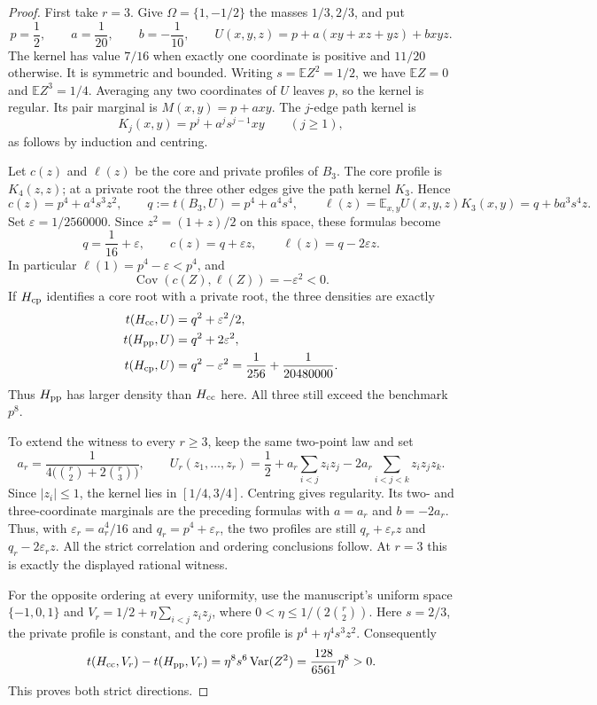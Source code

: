 \begin{proof}
First take $r=3$.  Give $\Omega=\{1,-1/2\}$ the masses $1/3,2/3$, and put
\[
 p=\frac12,\qquad a=\frac1{20},\qquad b=-\frac1{10},\qquad
 U(x,y,z)=p+a(xy+xz+yz)+bxyz.
\]
The kernel has value $7/16$ when exactly one coordinate is positive
and $11/20$ otherwise.  It is symmetric and bounded.
Writing $s=\mathbb EZ^2=1/2$, we have $\mathbb EZ=0$ and
$\mathbb EZ^3=1/4$.  Averaging any two coordinates of $U$ leaves
$p$, so the kernel is regular.  Its pair marginal is $M(x,y)=p+axy$.
The $j$-edge path kernel is
\[
 K_j(x,y)=p^j+a^js^{j-1}xy\qquad(j\ge1),
\]
as follows by induction and centring.

Let $c(z)$ and $\ell(z)$ be the core and private profiles of $B_3$.
The core profile is $K_4(z,z)$; at a private root the three other
edges give the path kernel $K_3$.  Hence
\[
 c(z)=p^4+a^4s^3z^2,\qquad
 q:=t(B_3,U)=p^4+a^4s^4,\qquad
 \ell(z)=\mathbb E_{x,y}U(x,y,z)K_3(x,y)
        =q+ba^3s^4z.
\]
Set $\varepsilon=1/2560000$.  Since $z^2=(1+z)/2$ on this space,
these formulas become
\[
 q=\frac1{16}+\varepsilon,\qquad
 c(z)=q+\varepsilon z,\qquad
 \ell(z)=q-2\varepsilon z.
\]
In particular $\ell(1)=p^4-\varepsilon<p^4$, and
\[
 \operatorname{Cov}(c(Z),\ell(Z))=-\varepsilon^2<0.
\]
If $H_{\rm cp}$ identifies a core root with a private root, the
three densities are exactly
\[
 \begin{split}
 t(H_{\rm cc},U)&=q^2+\varepsilon^2/2,\\
 t(H_{\rm pp},U)&=q^2+2\varepsilon^2,\\
 t(H_{\rm cp},U)&=q^2-\varepsilon^2
                 =\frac1{256}+\frac1{20480000}.
 \end{split}
\]
Thus $H_{\rm pp}$ has larger density than $H_{\rm cc}$ here.
All three still exceed the benchmark $p^8$.

To extend the witness to every $r\ge3$, keep the same two-point law and set
\[
 a_r=\frac1{4\bigl(\binom r2+2\binom r3\bigr)},\qquad
 U_r(z_1,\ldots,z_r)
 =\frac12+a_r\sum_{i<j}z_i z_j
             -2a_r\sum_{i<j<k}z_i z_j z_k.
\]
Since $|z_i|\le1$, the kernel lies in $[1/4,3/4]$.  Centring gives
regularity.  Its two- and three-coordinate marginals are the preceding
formulas with $a=a_r$ and $b=-2a_r$.  Thus, with
$\varepsilon_r=a_r^4/16$ and $q_r=p^4+\varepsilon_r$, the two profiles
are still $q_r+\varepsilon_rz$ and $q_r-2\varepsilon_rz$.
All the strict correlation and ordering conclusions follow.  At $r=3$
this is exactly the displayed rational witness.

For the opposite ordering at every uniformity, use the manuscript's
uniform space $\{-1,0,1\}$ and
$V_r=1/2+\eta\sum_{i<j}z_i z_j$, where
$0<\eta\le1/(2\binom r2)$.  Here $s=2/3$, the private profile is
constant, and the core profile is $p^4+\eta^4s^3z^2$.  Consequently
\[
 t(H_{\rm cc},V_r)-t(H_{\rm pp},V_r)
 =\eta^8s^6\operatorname{Var}(Z^2)
 =\frac{128}{6561}\eta^8>0.
\]
This proves both strict directions.
\end{proof}

